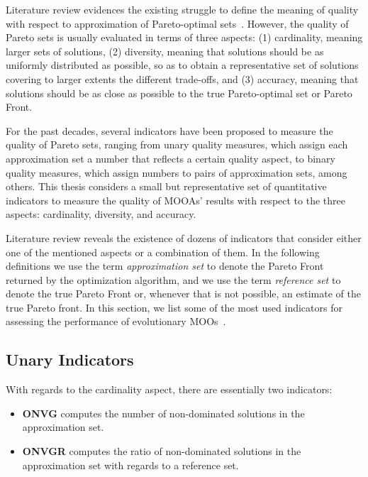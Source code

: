 Literature review evidences the existing struggle to define the meaning of quality with respect to approximation of Pareto-optimal sets~\cite{Knowles2002Metrics,Riquelme2015}. However, the quality of Pareto sets is usually evaluated in terms of three aspects: (1) cardinality, meaning larger sets of solutions, (2) diversity, meaning that solutions should be as uniformly distributed as possible, so as to obtain a representative set of solutions covering to larger extents the different trade-offs, and (3) accuracy, meaning that solutions should be as close as possible to the true Pareto-optimal set or Pareto Front. 

For the past decades, several indicators have been proposed to measure the quality of Pareto sets, ranging from unary quality measures, which assign each approximation set a number that reflects a certain quality aspect, to binary quality measures, which assign numbers to pairs of approximation sets, among others. This thesis considers a small but representative set of quantitative indicators to measure the quality of \acp{MOOA}' results with respect to the three aspects: cardinality, diversity, and accuracy. 

Literature review reveals the existence of dozens of indicators that consider either one of the mentioned aspects or a combination of them. In the following definitions we use the term \textit{approximation set} to denote the Pareto Front returned by the optimization algorithm, and we use the term \textit{reference set} to denote the true Pareto Front or, whenever that is not possible, an estimate of the true Pareto front. 
In this section, we list some of the most used indicators for assessing the performance of evolutionary \acp{MOO}~\cite{Riquelme2015}. 


\subsection{Unary Indicators}
With regards to the cardinality aspect, there are essentially two indicators:
\begin{itemize}
\item \textbf{\ac{ONVG}} computes the number of non-dominated solutions in the approximation set.
\item \textbf{\ac{ONVGR}} computes the ratio of non-dominated solutions in the approximation set with regards to a reference set.
\end{itemize}


